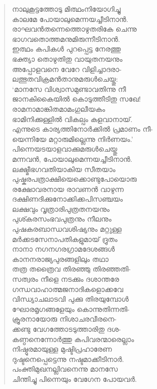 \begin{verse}
നാലുകൂട്ടത്തോടു മിത്ഥംനിയോഗിച്ചു\\
കാലമേ പോയാലുമെന്നയച്ചീടിനാന്‍.\\
രാഘവന്‍തന്നെത്തൊഴുതരികേ ചെന്നു\\
ഭാഗവതൊത്തമനുമിരുന്നീടിനാന്‍.\\
ഇത്ഥം കപികള്‍ പുറപ്പെട്ട നേരത്തു\\
ഭക്ത്യാ തൊഴുതിതു വായുതനയനും\\
അപ്പോളവനെ വേറേ വിളിച്ചാദരാ-\\
ലത്ഭുതവിക്രമന്‍താനുമരുള്‍ചെയ്തു:\\
‘മാനസേ വിശ്വാസമുണ്ടാവതിന്നു നീ\\
ജാനകികൈയില്‍ കൊടുത്തീടിതു സഖേ!\\
രാമനാമാങ്കിതമാമംഗുലീയകം\\
ഭാമിനിക്കുള്ളില്‍ വികല്പം കളവാനായ്.\\
എന്നുടെ കാര്യത്തിനോര്‍ക്കില്‍ പ്രമാണം നീ-\\
യെന്നിയേ മറ്റാരുമില്ലെന്നു നിര്‍ണയം.’\\
പിന്നെയടയാളവാക്കുമരുള്‍ചെയ്തു\\
മന്നവന്‍, പോയാലുമെന്നയച്ചീടിനാന്‍.\\
ലക്ഷ്മീഭഗവതിയാകിയ സീതയാം\\
പുഷ്കരപത്രാക്ഷിയെക്കൊണ്ടുപോയൊരു\\
രക്ഷോവരനായ രാവണന്‍ വാഴുന്ന\\
ദക്ഷിണദിക്കുനോക്കിക്കപിസഞ്ചയം\\
ലക്ഷവും വൃത്രാരിപുത്രതനയനും\\
പുശ്കരസംഭവപുത്രനും നീലനും\\
പുഷകരബാന്ധവശിഷ്യനും മറ്റുള്ള\\
മര്‍ക്കടസേനാപതികളുമായ് ദ്രുതം\\
നാനാ നഗനഗരഗ്രാമദേശങ്ങള്‍\\
കാനനരാജ്യപുരങ്ങളിലും തഥാ\\
തത്ര തത്രൈവ തിരഞ്ഞു തിരഞ്ഞതി-\\
സത്വരം നീളെ നടക്കും ദശാന്തരേ\\
ഗന്ധവാഹാത്മജനാദികളൊക്കവേ\\
വിന്ധ്യാചലാടവി പുക്കു തിരയുമ്പോള്‍\\
ഘോരമൃഗങ്ങളേയും കൊന്നുതിന്നതി-\\
ക്രൂരനായോരു നിശാചരവീരനെ-\\
ക്കണ്ടു വേഗത്തോടടുത്താരിതു ദശ-\\
കണ്ഠനെന്നോര്‍ത്തു കപിവരന്മാരെല്ലാം\\
നിഷ്ഠുരമായുള്ള മുഷ്ടിപ്രഹാരേണ\\
ദുഷ്ടനെപ്പെട്ടെന്നു നഷ്ടമാക്കീടിനാര്‍.\\
പംക്തിമുഖനല്ലിവനെന്നു മാനസേ\\
ചിന്തിച്ചു പിന്നെയും വേഗേന പോയവര്‍.
\end{verse}

